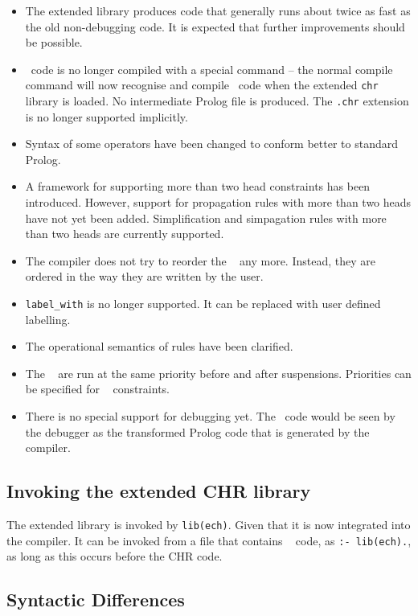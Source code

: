 \begin{itemize}
\item The extended library produces code that generally runs about twice as fast
as the old non-debugging code. It is expected that further improvements
should be possible.
\item \chr\  code is no longer compiled with a special command -- the normal
compile command will now recognise and compile \chr\  code when the extended
{\tt chr} library is loaded. No intermediate Prolog file is produced. The
{\tt .chr} extension is no longer supported implicitly.
\item Syntax of some operators have been changed to conform better to standard
Prolog.
\item A framework for supporting more than two head constraints has been
introduced. However, support for propagation rules with more than two heads
have not yet been added. Simplification and simpagation rules with more
than two heads are currently supported.
\item The compiler does not try to reorder the {\chr\ } any more. Instead, 
they are ordered in the way they are written by the user.
\item {\tt label_with} is no longer supported. It can be replaced with
user defined labelling.
\item The operational semantics of rules have been clarified.
\item The {\chr\ } are run at the same priority before and after
suspensions. Priorities can be specified for {\chr\ } constraints.
\item There is no special support for debugging yet. The \chr\  code would be
seen by the debugger as the transformed Prolog code that is generated by
the compiler.
\end{itemize}

\subsection{Invoking the extended CHR library}

The extended library is invoked by \verb'lib(ech)'. Given that it is now
integrated into the compiler. It can be invoked from a file that contains
{\chr\ } code, as \verb':- lib(ech).', as long as this occurs before the CHR
code.

\subsection{Syntactic Differences}

